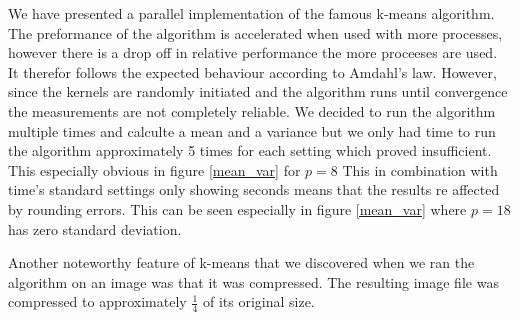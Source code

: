 
We have presented a parallel implementation of the famous k-means algorithm. The preformance of the algorithm is accelerated when used with more processes, however there is a drop off in relative performance the more proceeses are used. It therefor follows the expected behaviour according to Amdahl's law. However, since the kernels are randomly initiated and the algorithm runs until convergence the measurements are not completely reliable. We decided to run the algorithm multiple times and calculte a mean and a variance but we only had time to run the algorithm approximately 5 times for each setting which proved insufficient. This especially obvious in figure \ref{mean_var} for $p=8$ This in combination with time's standard settings only showing seconds means that the results re affected by rounding errors. This can be seen especially in figure \ref{mean_var} where $p=18$ has zero standard deviation.

Another noteworthy feature of k-means that we discovered when we ran the algorithm on an image was that it was compressed. The resulting image file was compressed to approximately $\frac{1}{4}$ of its original size.
